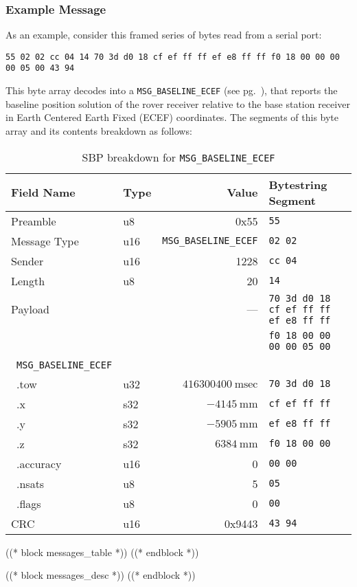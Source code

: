 \documentclass{article}
\numberwithin{table}{subsection}
\numberwithin{field}{subsection}
\begin{document}
\subsubsection*{Example Message}
\begin{large}
 \par As an example, consider this framed series of bytes read from a
 serial port:
\begin{verbatim}
55 02 02 cc 04 14 70 3d d0 18 cf ef ff ff ef e8 ff ff f0 18 00 00 00 00 05 00 43 94
\end{verbatim}
This byte array decodes into a \texttt{MSG\_BASELINE\_ECEF} (see
pg.~\pageref{sec:MSG_POS_ECEF}), that reports the baseline position
solution of the rover receiver relative to the base station receiver
in Earth Centered Earth Fixed (ECEF) coordinates. The segments of this
byte array and its contents breakdown as follows:
\end{large}
\begin{table}[h]
  \centering
  \begin{tabular}{llrl}
    \toprule
    Field Name & Type & Value & Bytestring Segment\\
    \midrule
    {Preamble} & u8 & 0x55 & \verb!55! \\
    {Message Type}& u16 & \texttt{MSG\_BASELINE\_ECEF} & \verb!02 02! \\
    {Sender}& u16 & 1228 & \verb!cc 04! \\
    {Length}& u8 & 20 &  \verb!14! \\
    {Payload}& & --- & \verb!70 3d d0 18 cf ef ff ff ef e8 ff ff! \\
    & & & \verb!f0 18 00 00 00 00 05 00! \\
    \quad~\texttt{MSG\_BASELINE\_ECEF} & & & \\
    \quad~.tow & u32 & $416300400~\textrm{msec}$  & \verb!70 3d d0 18! \\
    \quad~.x & s32 & $-4145~\textrm{mm}$  & \verb!cf ef ff ff! \\
    \quad~.y & s32 & $-5905~\textrm{mm}$  & \verb!ef e8 ff ff! \\
    \quad~.z & s32 & $6384~\textrm{mm}$  & \verb!f0 18 00 00! \\
    \quad~.accuracy & u16 & 0 & \verb!00 00! \\
    \quad~.nsats & u8 & 5 & \verb!05! \\
    \quad~.flags & u8 & 0 & \verb!00! \\
    {CRC} & u16 & 0x9443 & \verb!43 94! \\
    \bottomrule
  \end{tabular}
  \caption{SBP breakdown for \texttt{MSG\_BASELINE\_ECEF}}
  \label{tab:example_breakdown}
\end{table}

((* block messages_table *))
((* endblock *))

((* block messages_desc *))
((* endblock *))
\end{document}
